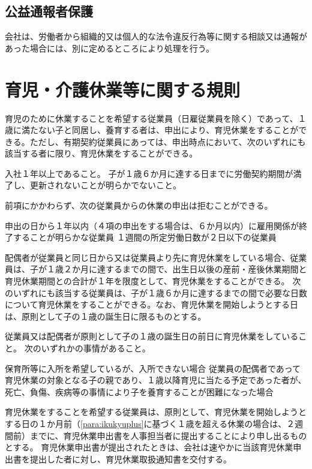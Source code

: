 \documentclass[10pt,a4paper]{jsarticle}
\begin{document}
\subsection{公益通報者保護}

会社は、労働者から組織的又は個人的な法令違反行為等に関する相談又は通報があった場合には、別に定めるところにより処理を行う。



\clearpage
\section{育児・介護休業等に関する規則}

育児のために休業することを希望する従業員（日雇従業員を除く）であって、１歳に満たない子と同居し、養育する者は、申出により、育児休業をすることができる。ただし、有期契約従業員にあっては、申出時点において、次のいずれにも該当する者に限り、育児休業をすることができる。
\label{para:ChildcareLayoff}
\begin{enumerate}
    \itm 入社１年以上であること。
    \itm 子が１歳６か月に達する日までに労働契約期間が満了し、更新されないことが明らかでないこと。
\end{enumerate}
\term 前項にかかわらず、次の従業員からの休業の申出は拒むことができる。
\begin{enumerate}
    \itm 申出の日から１年以内（４項の申出をする場合は、６か月以内）に雇用関係が終了することが明らかな従業員
    \itm １週間の所定労働日数が２日以下の従業員
\end{enumerate}
\term 配偶者が従業員と同じ日から又は従業員より先に育児休業をしている場合、従業員は、子が１歳２か月に達するまでの間で、出生日以後の産前・産後休業期間と育児休業期間との合計が１年を限度として、育児休業をすることができる。
\label{para:ikukyuplus}
\term 次のいずれにも該当する従業員は、子が１歳６か月に達するまでの間で必要な日数について育児休業をすることができる。なお、育児休業を開始しようとする日は、原則として子の１歳の誕生日に限るものとする。
\begin{enumerate}
    \itm 従業員又は配偶者が原則として子の１歳の誕生日の前日に育児休業をしていること。
    \itm 次のいずれかの事情があること。
    \begin{enumerate}
        \itm 保育所等に入所を希望しているが、入所できない場合
        \itm 従業員の配偶者であって育児休業の対象となる子の親であり、１歳以降育児に当たる予定であった者が、死亡、負傷、疾病等の事情により子を養育することが困難になった場合
    \end{enumerate}
\end{enumerate}
\term 育児休業をすることを希望する従業員は、原則として、育児休業を開始しようとする日の１か月前（\ref{para:ikukyuplus}に基づく１歳を超える休業の場合は、２週間前）までに、育児休業申出書を人事担当者に提出することにより申し出るものとする。
\term 育児休業申出書が提出されたときは、会社は速やかに当該育児休業申出書を提出した者に対し、育児休業取扱通知書を交付する。
\end{document}
